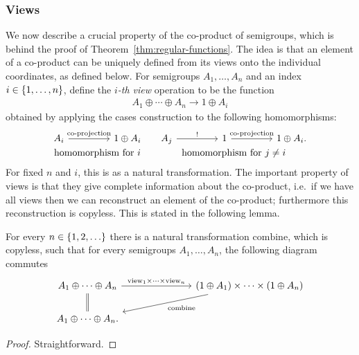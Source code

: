 \subsubsection{Views}
\label{sec:views}
We now describe a crucial property of the co-product of semigroups, which is behind the proof of Theorem~\ref{thm:regular-functions}. The idea is that an element of a co-product can be uniquely defined from its views onto the individual coordinates, as defined below. 
For semigroups $A_1,\ldots,A_n$ and an index $i \in \{1,\ldots,n\}$, define the \emph{$i$-th view} operation to be the function 
\begin{align*}
A_1 \oplus \cdots \oplus A_n \to 1 \oplus A_i
\end{align*}
 obtained by applying the cases construction to the following  homomorphisms:
\[
    \begin{tabular}{cc}
\begin{tikzcd}
    [column sep=1.5cm]
    A_i 
    \ar[r,"\text{co-projection}"] 
    &
    1 \oplus A_i
    \end{tikzcd}
&
\begin{tikzcd}
    [column sep=1.5cm]
A_j 
\ar[r,"!"]
&
1
\ar[r,"\text{co-projection}"] 
&
1 \oplus A_i.
\end{tikzcd}\\
\text{homomorphism for $i$}
&
\text{homomorphism for $j\neq i$}
\end{tabular}
\]
For fixed $n$ and $i$, this is  as a natural transformation. The important property of views is that they give complete information about the co-product, i.e.~if we have all views then we can reconstruct an element of the co-product; furthermore this reconstruction is copyless. This is stated in the following lemma. 

\newcommand{\combine}{\mathrm{combine}}
\newcommand{\view}{\mathrm{view}}
\begin{lemma}
\label{lem:views}
    For every $n \in \{1,2,\ldots\}$ there is a natural transformation $\combine$, which is copyless, such that for every semigroups $A_1,\ldots,A_n$, the following diagram commutes 
\[
\begin{tikzcd}
    [column sep=2.5cm]
A_1 \oplus \cdots \oplus A_n 
\ar[d,equal]
\ar[r,"\view_1 \times \cdots \times \view_n"]
&
(1 \oplus A_1) \times \cdots \times (1 \oplus A_n)
\ar[dl,"\combine"]
\\
A_1 \oplus \cdots \oplus A_n.
\end{tikzcd}
\]
\end{lemma}
\begin{proof}
    Straightforward.
\end{proof}

